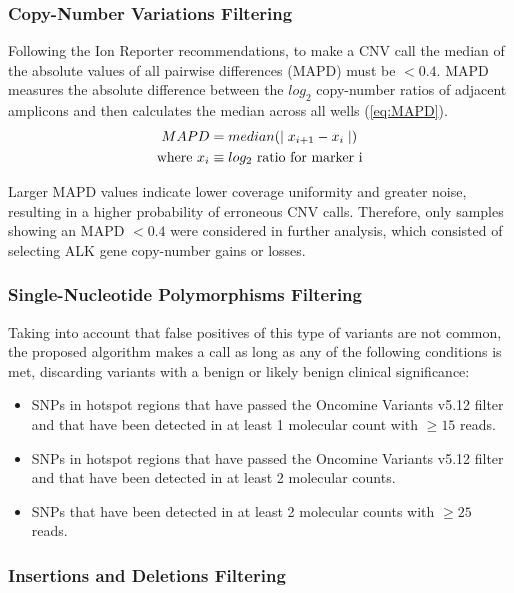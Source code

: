 \subsubsection{Copy-Number Variations Filtering}

Following the Ion Reporter\texttrademark{} recommendations, to make a CNV call the median of the absolute values of all pairwise differences (MAPD) must be $< 0.4$. MAPD measures the absolute difference between the $log_2$ copy-number ratios of adjacent amplicons and then calculates the median across all wells (\autoref{eq:MAPD}).
\begin{align} \label{eq:MAPD}
    MAPD &= median(\mid x_{i+1}-x_i \mid) \\
    \text{where}~
    x_i &\equiv \text{$log_2$ ratio for marker i} \notag
\end{align}

Larger MAPD values indicate lower coverage uniformity and greater noise, resulting in a higher probability of erroneous CNV calls. Therefore, only samples showing an MAPD $< 0.4$ were considered in further analysis, which consisted of selecting ALK gene copy-number gains or losses.

\subsubsection{Single-Nucleotide Polymorphisms Filtering}

Taking into account that false positives of this type of variants are not common, the proposed algorithm makes a call as long as any of the following conditions is met, discarding variants with a benign or likely benign clinical significance:
\begin{itemize}
    \item SNPs in hotspot regions that have passed the Oncomine\texttrademark{} Variants v5.12 filter and that have been detected in at least 1 molecular count with $\ge 15$ reads.
    \item SNPs in hotspot regions that have passed the Oncomine\texttrademark{} Variants v5.12 filter and that have been detected in at least 2 molecular counts.
    \item SNPs that have been detected in at least 2 molecular counts with $\ge 25$ reads.
\end{itemize}

\subsubsection{Insertions and Deletions Filtering}

